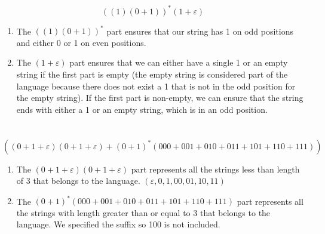 \documentclass[20pt]{article}
\begin{document}
\noindent
\section*{}

\begin{equation}
    ((1)(0+1))^*(1 + \varepsilon)\nonumber
\end{equation}
\begin{enumerate}[label=\alph*]
    \item 
    The $((1)(0+1))^*$ part ensures that our string has 1 on odd positions and either 0 or 1 on even positions. 
    \item
    The $(1 + \varepsilon)$ part ensures that we can either have a single 1 or an empty string if the first part is empty (the empty string is considered part of the language because there does not exist a 1 that is not in the odd position for the empty string). If the first part is non-empty, we can ensure that the string ends with either a 1 or an empty string, which is in an odd position.
\end{enumerate}


\noindent
\section*{}

\begin{equation}
    ((0 + 1 + \varepsilon)(0 + 1 + \varepsilon) + (0 + 1)^*(000 + 001 + 010+ 011 + 101 + 110+ 111))\nonumber
\end{equation}

\begin{enumerate} [label=\alph*]
    \item 
    The $(0 + 1 + \varepsilon)(0 + 1 + \varepsilon)$ part represents all the strings less than length of 3 that belongs to the language. $(\varepsilon, 0, 1, 00, 01, 10, 11)$
    \item
    The $(0 + 1)^*(000 + 001 + 010+ 011 + 101 + 110+ 111)$ part represents all the strings with length greater than or equal to 3 that belongs to the language. We specified the suffix so 100 is not included.
\end{enumerate}




\newpage
\end{document}
